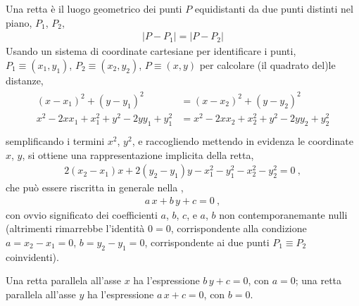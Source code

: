 \documentclass[letterpaper,10pt,english]{jupyterBook}
\begin{document}
\sphinxAtStartPar
{} Una retta è il luogo geometrico dei punti \(P\) equidistanti da due punti distinti nel piano, \(P_1\), \(P_2\),
\begin{equation*}
\begin{split}|P - P_1| = |P-P_2|\end{split}
\end{equation*}
\sphinxAtStartPar
Usando un sistema di coordinate cartesiane per identificare i punti, \(P_1 \equiv (x_1, y_1)\), \(P_2 \equiv (x_2, y_2)\), \(P \equiv (x,y)\) per calcolare (il quadrato del)le distanze,
\begin{equation*}
\begin{split}\begin{aligned}
 (x - x_1)^2 + (y - y_1)^2 &=  (x - x_2)^2 + (y - y_2)^2 \\
 x^2 - 2 x x_1 + x_1^2 + y^2 - 2 y y_1 + y_1^2 &=  x^2 - 2 x x_2 + x_2^2 + y^2 - 2 y y_2 + y_2^2 \\
\end{aligned}\end{split}
\end{equation*}
\sphinxAtStartPar
semplificando i termini \(x^2\), \(y^2\), e raccogliendo mettendo in evidenza le coordinate \(x\), \(y\), si ottiene una rappresentazione implicita della retta,
\begin{equation*}
\begin{split}  2 ( x_2 - x_1 ) x + 2 ( y_2 - y_1 ) y - x_1^2 - y_1^2 - x_2^2 - y_2^2 = 0 \ ,\end{split}
\end{equation*}
\sphinxAtStartPar
che può essere riscritta in generale nella ,
\begin{equation*}
\begin{split}a \, x + b \, y + c = 0 \ ,\end{split}
\end{equation*}
\sphinxAtStartPar
con ovvio significato dei coefficienti \(a\), \(b\), \(c\), e \(a\), \(b\) non contemporanemante nulli (altrimenti rimarrebbe l’identità \(0 = 0\), corrispondente alla condizione \(a = x_2 - x_1 = 0\), \(b = y_2 - y_1 = 0\), corrispondente ai due punti \(P_1 \equiv P_2\) coinvidenti).

\sphinxAtStartPar
{} Una retta parallela all’asse \(x\) ha l’espressione \(b \, y + c = 0\), con \(a = 0\); una retta parallela all’asse \(y\) ha l’espressione \(a \, x + c = 0\), con \(b=0\).
\end{document}
